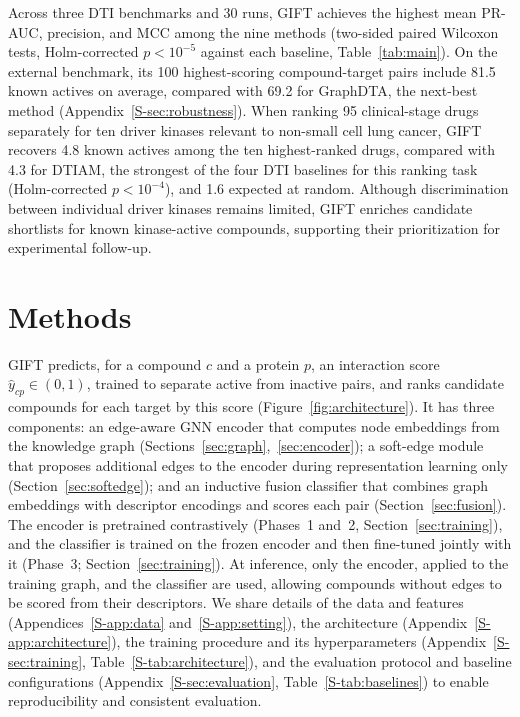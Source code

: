 \documentclass[10pt,letterpaper]{article}
\begin{document}
Across three DTI benchmarks and 30 runs, GIFT achieves the highest mean PR-AUC, precision, and MCC among the nine methods (two-sided paired Wilcoxon tests, Holm-corrected $p<10^{-5}$ against each baseline, Table~\ref{tab:main}).
On the external benchmark, its 100 highest-scoring compound-target pairs include 81.5 known actives on average, compared with 69.2 for GraphDTA, the next-best method (Appendix~\ref{S-sec:robustness}).
When ranking 95 clinical-stage drugs separately for ten driver kinases relevant to non-small cell lung cancer, GIFT recovers 4.8 known actives among the ten highest-ranked drugs, compared with 4.3 for DTIAM, the strongest of the four DTI baselines for this ranking task (Holm-corrected $p<10^{-4}$), and 1.6 expected at random.
Although discrimination between individual driver kinases remains limited, GIFT enriches candidate shortlists for known kinase-active compounds, supporting their prioritization for experimental follow-up.

\section{Methods}
\label{sec:methods}
GIFT predicts, for a compound $c$ and a protein $p$, an interaction score $\hat{y}_{cp}\in(0,1)$, trained to separate active from inactive pairs, and ranks candidate compounds for each target by this score (Figure~\ref{fig:architecture}). It has three components: an edge-aware GNN encoder that computes node embeddings from the knowledge graph (Sections~\ref{sec:graph},~\ref{sec:encoder}); a soft-edge module that proposes additional edges to the encoder during representation learning only (Section~\ref{sec:softedge}); and an inductive fusion classifier that combines graph embeddings with descriptor encodings and scores each pair (Section~\ref{sec:fusion}). The encoder is pretrained contrastively (Phases~1 and~2, Section~\ref{sec:training}), and the classifier is trained on the frozen encoder and then fine-tuned jointly with it (Phase~3; Section~\ref{sec:training}). At inference, only the encoder, applied to the training graph, and the classifier are used, allowing compounds without edges to be scored from their descriptors. We share details of the data and features (Appendices~\ref{S-app:data} and~\ref{S-app:setting}), the architecture (Appendix~\ref{S-app:architecture}), the training procedure and its hyperparameters (Appendix~\ref{S-sec:training}, Table~\ref{S-tab:architecture}), and the evaluation protocol and baseline configurations (Appendix~\ref{S-sec:evaluation}, Table~\ref{S-tab:baselines}) to enable reproducibility and consistent evaluation.
\end{document}
